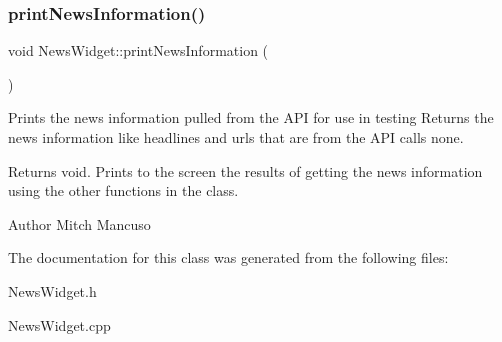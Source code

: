 \subsubsection{\texorpdfstring{print\+News\+Information()}{printNewsInformation()}}
{\footnotesize\ttfamily void News\+Widget\+::print\+News\+Information (\begin{DoxyParamCaption}{ }\end{DoxyParamCaption})}



Prints the news information pulled from the A\+PI for use in testing  Returns the news information like headlines and urls that are from the A\+PI calls  none. 

\begin{DoxyReturn}{Returns}
void. Prints to the screen the results of getting the news information using the other functions in the class. 
\end{DoxyReturn}
\begin{DoxyAuthor}{Author}
Mitch Mancuso 
\end{DoxyAuthor}


The documentation for this class was generated from the following files\+:\begin{DoxyCompactItemize}
\item 
News\+Widget.\+h\item 
News\+Widget.\+cpp\end{DoxyCompactItemize}
